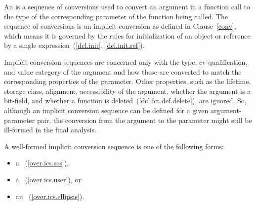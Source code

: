 \pnum
An
%
is a sequence of conversions used
to convert an argument in a function call to the type of the
corresponding parameter of the function being called.
The
sequence of conversions is an implicit conversion as defined in
Clause~\ref{conv}, which means it is governed by the rules for
initialization of an object or reference by a single
expression~(\ref{dcl.init}, \ref{dcl.init.ref}).

\pnum
Implicit conversion sequences are concerned only with the type,
cv-qualification, and value category of the argument and how these
are converted to match the corresponding properties of the
parameter.
Other properties, such as the lifetime, storage class,
alignment, accessibility of the argument, whether the argument is a bit-field,
and whether a function is deleted~(\ref{dcl.fct.def.delete}), are ignored.
So, although an implicit
conversion sequence can be defined for a given argument-parameter
pair, the conversion from the argument to the parameter might still
be ill-formed in the final analysis.

\pnum
A
well-formed implicit conversion
sequence is one of the following forms:

\begin{itemize}
\item
a
~(\ref{over.ics.scs}),
\item
a
~(\ref{over.ics.user}), or
\item
an
~(\ref{over.ics.ellipsis}).
\end{itemize}

